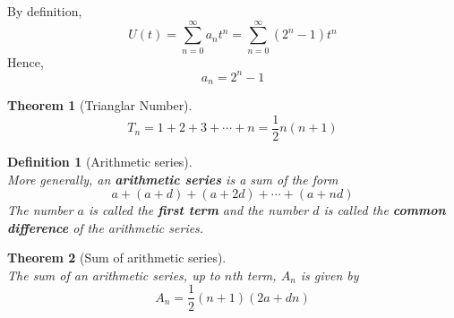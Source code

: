 \documentclass[12pt]{article}
\newtheorem{definition}{Definition}[section]
\newtheorem{theorem}{Theorem}[section]
\theoremstyle{definition}
\begin{document}
By definition,
\[
U(t)=\sum_{n=0}^\infty a_nt^n = \sum_{n=0}^\infty (2^n-1)t^n
\]
Hence,
\[
a_n = 2^n - 1
\]
\begin{theorem}[Trianglar Number]
\[
T_n = 1+2+3+\cdots+n = \frac{1}{2}n(n+1)
\]
\end{theorem}
\begin{definition}[Arithmetic series]
\hfill\\\normalfont More generally, an \textbf{arithmetic series} is a sum of the form
\[
a+(a+d)+(a+2d)+\cdots+(a+nd)
\]
The number $a$ is called the \textbf{first term} and the number $d$ is called the \textbf{common difference} of the arithmetic series.
\end{definition}
\begin{theorem}[Sum of arithmetic series]
\hfill\\\normalfont The sum of an arithmetic series, up to $n$th term, $A_n$ is given by
\[
A_n = \frac{1}{2}(n+1)(2a+dn)
\]
\end{theorem}
\end{document}
